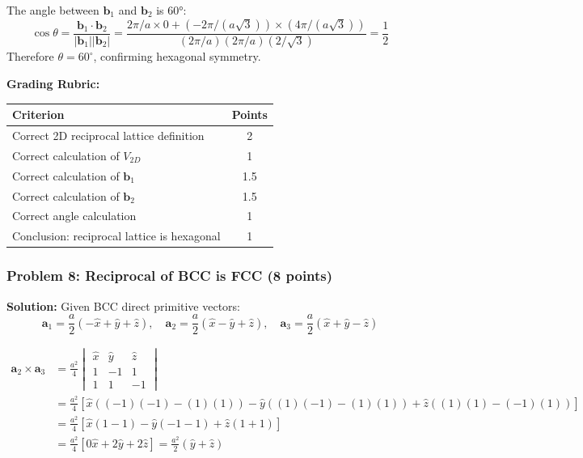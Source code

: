 \documentclass[12pt,a4paper]{article}
\begin{document}
The angle between $\mathbf{b}_1$ and $\mathbf{b}_2$ is 60°:
\[\cos \theta = \frac{\mathbf{b}_1 \cdot \mathbf{b}_2}{|\mathbf{b}_1||\mathbf{b}_2|} = \frac{2\pi/a \times 0 + (-2\pi/(a\sqrt{3})) \times (4\pi/(a\sqrt{3}))}{(2\pi/a)(2\pi/a)(2/\sqrt{3})} = \frac{1}{2}\]
Therefore $\theta = 60^\circ$, confirming hexagonal symmetry.

\textbf{Grading Rubric:}
\begin{table}[h]
\centering
\begin{tabular}{|p{10cm}|c|}
\hline
\textbf{Criterion} & \textbf{Points} \\
\hline
Correct 2D reciprocal lattice definition & 2 \\
Correct calculation of $V_{2D}$ & 1 \\
Correct calculation of $\mathbf{b}_1$ & 1.5 \\
Correct calculation of $\mathbf{b}_2$ & 1.5 \\
Correct angle calculation & 1 \\
Conclusion: reciprocal lattice is hexagonal & 1 \\
\hline
\end{tabular}
\end{table}

\subsubsection*{Problem 8: Reciprocal of BCC is FCC (8 points)}
\textbf{Solution:}
Given BCC direct primitive vectors:
\[\mathbf{a}_1 = \frac{a}{2}(-\hat{x} + \hat{y} + \hat{z}), \quad \mathbf{a}_2 = \frac{a}{2}(\hat{x} - \hat{y} + \hat{z}), \quad \mathbf{a}_3 = \frac{a}{2}(\hat{x} + \hat{y} - \hat{z})\]

\begin{align*}
\mathbf{a}_2 \times \mathbf{a}_3 &= \frac{a^2}{4}
\begin{vmatrix}
\hat{x} & \hat{y} & \hat{z} \\
1 & -1 & 1 \\
1 & 1 & -1
\end{vmatrix} \\
&= \frac{a^2}{4}[\hat{x}((-1)(-1) - (1)(1)) - \hat{y}((1)(-1) - (1)(1)) + \hat{z}((1)(1) - (-1)(1))] \\
&= \frac{a^2}{4}[\hat{x}(1-1) - \hat{y}(-1-1) + \hat{z}(1+1)] \\
&= \frac{a^2}{4}[0\hat{x} + 2\hat{y} + 2\hat{z}] = \frac{a^2}{2}(\hat{y} + \hat{z})
\end{align*}
\end{document}
